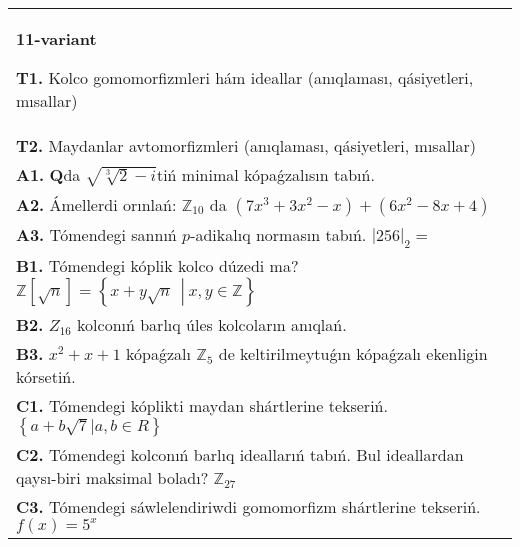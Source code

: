 \documentclass{article}
\begin{document}
\begin{tabular}{m{17cm}}
\textbf{11-variant}
\newline

\textbf{T1.} Kolco gomomorfizmleri hám ideallar (anıqlaması, qásiyetleri, mısallar) \\
\textbf{T2.} Maydanlar avtomorfizmleri (anıqlaması, qásiyetleri, mısallar) \\
\textbf{A1.} \(\mathbf{Q}\)da \(\sqrt{\sqrt[3]{2} - i}\)tiń minimal kópaǵzalısın tabıń. \\
\textbf{A2.} Ámellerdi orınlań: \(\mathbb{Z}_{10}\) da \(\left( 7x^{3} + 3x^{2} - x \right) + \left( 6x^{2} - 8x + 4 \right)\) \\
\textbf{A3.} Tómendegi sannıń \(p\)-adikalıq normasın tabıń. \(|256|_{2} =\) \\
\textbf{B1.} Tómendegi kóplik kolco dúzedi ma? \(\mathbb{Z}\left\lbrack \sqrt{n} \right\rbrack = \left\{ x + y\sqrt{n}\ \ \left| \right.\ x,y \in \mathbb{Z} \right\}\) \\
\textbf{B2.} \(Z_{16}\) kolconıń barlıq úles kolcoların anıqlań. \\
\textbf{B3.} \(x^{2} + x + 1\) kópaǵzalı \(\mathbb{Z}_{5}\) de keltirilmeytuǵın kópaǵzalı ekenligin kórsetiń. \\
\textbf{C1.} Tómendegi kóplikti maydan shártlerine tekseriń. \(\left\{ a + b\sqrt{7}|a,b \in R \right\}\) \\
\textbf{C2.} Tómendegi kolconıń barlıq ideallarıń tabıń. Bul ideallardan qaysı-biri maksimal boladı? \(\mathbb{Z}_{27}\) \\
\textbf{C3.} Tómendegi sáwlelendiriwdi gomomorfizm shártlerine tekseriń. \(f(x) = 5^{x}\) \\

\end{tabular}
\vspace{1cm}
\end{document}
